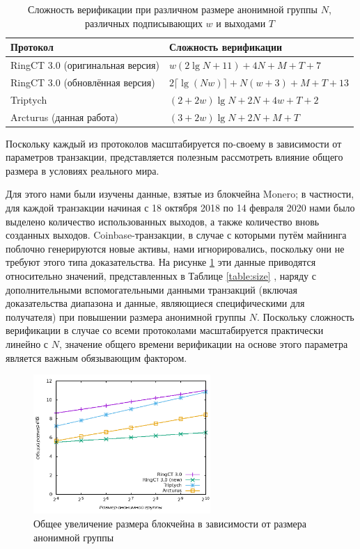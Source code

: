 \documentclass{article}
\theoremstyle{definition}
\begin{document}
\begin{table}
\centering
\begin{tabular}{|ll|}
\hline
Протокол & Сложность верификации \\
\hline
RingCT 3.0 (оригинальная версия) \cite{rct3} & $w(2\lg N + 11) + 4N + M + T + 7$ \\
RingCT 3.0 (обновлённая версия) \cite{rct3} & $2\lceil \lg(Nw) \rceil + N(w + 3) + M + T + 13$ \\
Triptych \cite{triptych} & $(2 + 2w)\lg N + 2N + 4w + T + 2$ \\
Arcturus (данная работа) & $(3 + 2w)\lg N + 2N + M + T$ \\
\hline
\end{tabular}
\caption{Сложность верификации при различном размере анонимной группы $N$, различных подписывающих $w$ и выходами $T$}
\label{table:time}
\end{table}

Поскольку каждый из протоколов масштабируется по-своему в зависимости от параметров транзакции, представляется полезным рассмотреть влияние общего размера в условиях реального мира.

Для этого нами были изучены данные, взятые из блокчейна Monero; в частности, для каждой транзакции начиная с 18 октября 2018 по 14 февраля 2020 нами было выделено количество использованных выходов, а также количество вновь созданных выходов.
Coinbase-транзакции, в случае с которыми путём майнинга поблочно генерируются новые активы, нами игнорировались, поскольку они не требуют этого типа доказательства.
На рисунке \ref{fig:size} эти данные приводятся относительно значений, представленных в Таблице \ref{table:size} , наряду с дополнительными вспомогательными данными транзакций (включая доказательства диапазона и данные, являющиеся специфическими для получателя) при повышении размера анонимной группы $N$.
Поскольку сложность верификации в случае со всеми протоколами масштабируется практически линейно с $N$, значение общего времени верификации на основе этого параметра является важным обязывающим фактором.

\begin{figure}
\centering
\includegraphics[width=0.6\textwidth]{size.png}
\caption{Общее увеличение размера блокчейна в зависимости от размера анонимной группы}
\label{fig:size}
\end{figure}
\end{document}
